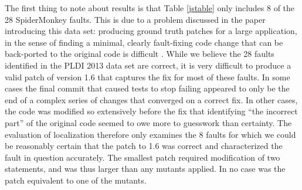 The first thing to note about results is that Table \ref{jstable} only includes 8 of the 28 SpiderMonkey faults.  This is due to a problem discussed in the paper introducing this data set:  producing ground truth patches for a large application, in the sense of finding a minimal, clearly fault-fixing code change that can be back-ported to the original code is difficult \cite{PLDI13}.  While we believe the 28 faults identified in the PLDI 2013 data set are correct, it is very difficult to produce a valid patch of version 1.6 that captures the fix for most of these faults.  In some cases the final commit that caused tests to stop failing appeared to only be the end of a complex series of changes that converged on a correct fix.  In other cases, the code was modified so extensively before the fix that identifying ``the incorrect part'' of the original code seemed to owe more to guesswork than certainty.  The evaluation of localization therefore only examines the 8 faults for which we could be reasonably certain that the patch to 1.6 was correct and characterized the fault in question accurately.  The smallest patch required modification of two statements, and was thus larger than any mutants applied.  In no case was the patch equivalent to one of the mutants.

